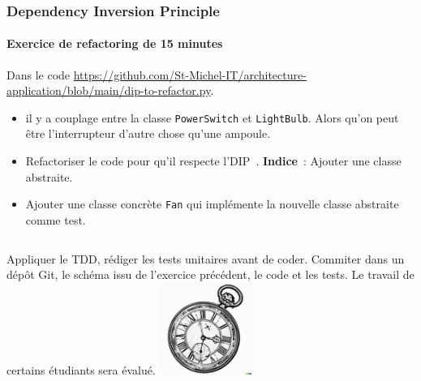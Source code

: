\documentclass{beamer}
\begin{document}
    \begin{frame}
        \transdissolve
        \frametitle{Dependency Inversion Principle}
        \framesubtitle{Exercice \execcounterdispinc{} de refactoring de 15 minutes}
        Dans le code \url{https://github.com/St-Michel-IT/architecture-application/blob/main/dip-to-refactor.py}.
        \begin{itemize}
            \item il y a couplage entre la classe \lstinline{PowerSwitch} et \lstinline{LightBulb}.
            Alors qu'on peut être l'interrupteur d'autre chose qu'une ampoule.
            \item Refactoriser le code pour qu'il respecte l'DIP~. \textbf{Indice}~: Ajouter une classe abstraite.
            \item Ajouter une classe concrète \lstinline{Fan} qui implémente la nouvelle classe abstraite comme test.
        \end{itemize}
        \bigbreak
        \begin{columns}
            Appliquer le TDD, rédiger les tests unitaires avant de coder.
            \bigbreak
            Commiter dans un dépôt Git, le schéma issu de l'exercice précédent, le code et les tests.
            \bigbreak
            Le travail de certains étudiants sera évalué.
            \centering
            \includegraphics[width=3cm]{image/engraving-of-an-old-watch}
        \end{columns}
    \end{frame}
\end{document}

